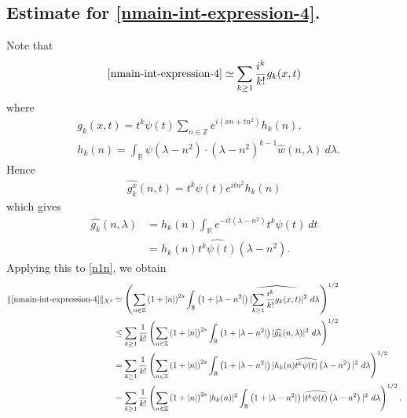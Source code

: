 \documentclass[12pt,reqno]{amsart}
\numberwithin{equation}{section}  %
\newcommand{\rr}{\mathbb{R}}
\newcommand{\zz}{\mathbb{Z}}
\newcommand{\wh}{\widehat}
\begin{document}
\subsection{Estimate for \eqref{nmain-int-expression-4}.}
Note that
%
%
\begin{equation}
	\label{n1n}
	\begin{split}
		\eqref{nmain-int-expression-4} \simeq \sum_{k \ge 1}
		\frac{i^k}{k!}g_k(x,t)
	\end{split}
\end{equation}
%
%
where 
%
%
\begin{equation*}
	\begin{split}
		& g_k(x,t) = t^k \psi(t) \sum_{n \in \zz} e^{i\left( xn + tn^{2}
		\right)} h_k(n),
		\\
		& h_k(n) = \int_\rr \psi \left( \lambda - n^{2} \right) \cdot \left(
		\lambda - n^{2} \right)^{k -1} \wh{w}(n, \lambda) \ d \lambda.
	\end{split}
\end{equation*}
%
%
Hence
%
%
\begin{equation*}
	\begin{split}
		\wh{g_k^x}(n, t) = t^{k} \psi(t) e^{i t n^{2}} h_k(n)
	\end{split}
\end{equation*}
%
%
which gives
%
%
\begin{equation*}
	\begin{split}
		\wh{g_k}(n, \lambda)
		& = h_k(n) \int_\rr e^{-it\left( \lambda - n^{2} \right)}
		t^{k}\psi(t) \ dt
		\\
		& = h_k(n) \wh{t^{k}\psi(t)} \left( \lambda - n^{2} \right).
	\end{split}
\end{equation*}
%
%
Applying this to \eqref{n1n}, we obtain
%
%
\begin{equation}
	\label{n2n}
	\begin{split}
		\|\eqref{nmain-int-expression-4}\|_{X^s} 
		& \simeq \left( \sum_{n \in \zz} \left (1 + |n| \right )^{2s} \int_\rr \left( 1 + | \lambda -
		n^{2}
		|
		\right) | \wh{\sum_{k \ge 1} \frac{i^k}{k!}g_k(x,t)} |^2 \ d \lambda
		\right)^{1/2}
		\\
		& \le \sum_{k \ge 1} \frac{1}{k!}\left( \sum_{n \in \zz} \left (1 + |n| \right )^{2s}
		\int_\rr \left( 1 + | \lambda - n^{2} | \right) | \wh{g_k}(n, \lambda) |^2 \
		d \lambda \right)^{1/2}
		\\
		& = \sum_{k \ge 1} \frac{1}{k!} \left( \sum_{n \in \zz} \left (1 + |n| \right )^{2s}
		\int_\rr \left( 1 + | \lambda - n^{2} | \right) | h_k(n) \wh{t^k
		\psi(t)} \left( \lambda - n^{2} \right) |^2 \ d \lambda \right)^{1/2}
		\\
		& = \sum_{k \ge 1} \frac{1}{k!} \left( \sum_{n \in \zz} \left (1 + |n| \right )^{2s} |
		h_k(n) |^2 \int_\rr \left( 1 + | \lambda - n^{2} | \right) | \wh{t^k
		\psi(t)} \left( \lambda - n^{2} \right) |^2 \ d \lambda \right)^{1/2}.
	\end{split}
\end{equation}
\end{document}
